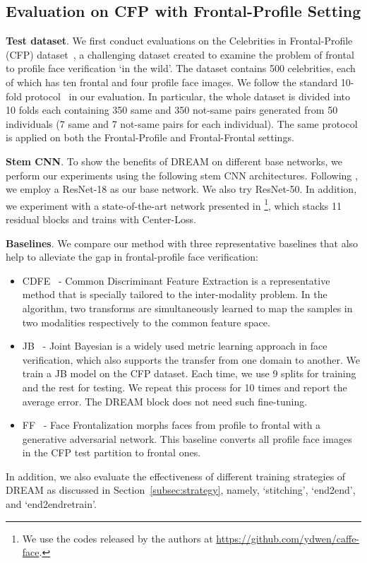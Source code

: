 \documentclass[10pt,twocolumn,letterpaper]{article}
\begin{document}
\subsection{Evaluation on CFP with Frontal-Profile Setting}



\noindent
\textbf{Test dataset}.
We first conduct evaluations on the Celebrities in Frontal-Profile (CFP) dataset~\cite{sengupta2016frontal}, a challenging dataset created to examine the problem of frontal to profile face verification `in the wild'. 
The dataset contains 500 celebrities, each of which has ten frontal and four profile face images. We follow the standard 10-fold protocol~\cite{sengupta2016frontal} in our evaluation. In particular, the whole dataset is divided into 10 folds each containing 350 same and 350 not-same pairs generated from 50 individuals (7 same and 7 not-same pairs for each individual). The same protocol is applied on both the Frontal-Profile and Frontal-Frontal settings.


\noindent
\textbf{Stem CNN}.
To show the benefits of DREAM on different base networks, we perform our experiments using the following stem CNN architectures. Following \cite{wu2016deep}, we employ a ResNet-18 as our base network. We also try ResNet-50.  
In addition, we experiment with a state-of-the-art network presented in \cite{wen2016discriminative}\footnote{We use the codes released by the authors at \url{https://github.com/ydwen/caffe-face}.}, which stacks 11 residual blocks and trains with Center-Loss. 

\noindent
\textbf{Baselines}.
We compare our method with three representative baselines that also help to alleviate the gap in frontal-profile face verification:
\begin{itemize}[noitemsep, topsep=0pt]
\itemsep0em 
\item CDFE~\cite{lin2006inter} -  Common Discriminant Feature Extraction is a representative method that is specially tailored to the inter-modality problem. In the algorithm, two transforms are simultaneously learned to map the samples in two modalities respectively to the common feature space.
\item JB~\cite{chen2012bayesian,cao2013practical} - Joint Bayesian is a widely used metric learning approach in face verification, which also supports the transfer from one domain to another. We train a JB model on the CFP dataset. Each time, we use 9 splits for training and the rest for testing. We repeat this process for 10 times and report the average error. The DREAM block does not need such fine-tuning.
\item FF~\cite{tran2017disentangled} - Face Frontalization morphs faces from profile to frontal with a generative adversarial network. This baseline converts all profile face images in the CFP test partition to frontal ones.
\end{itemize}
In addition, we also evaluate the effectiveness of different training strategies of DREAM as discussed in Section~\ref{subsec:strategy}, namely, `stitching', `end2end', and `end2endretrain'.
\end{document}
